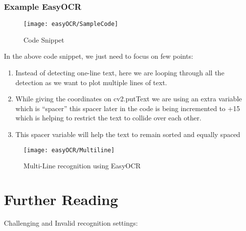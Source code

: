 \subsubsection{Example EasyOCR}

\begin{figure}[h!]
	\centering
	\texttt{[image: easyOCR/SampleCode]}
	\caption{Code Snippet}
\end{figure}

In the above code snippet, we just need to focus on few points:

\begin{enumerate}
	\item Instead of detecting one-line text, here we are looping through all the detection as we want to plot multiple lines of text.
	\item While giving the coordinates on cv2.putText we are using an extra variable which is “spacer” this spacer later in the code is being incremented to +15 which is helping to restrict the text to collide over each other.
	\item This spacer variable will help the text to remain sorted and equally spaced
\end{enumerate}
\begin{figure}[h!]
	\centering
	\texttt{[image: easyOCR/Multiline]}
	\caption{Multi-Line recognition using EasyOCR}
\end{figure}


\section{Further Reading}

Challenging and Invalid recognition settings:

